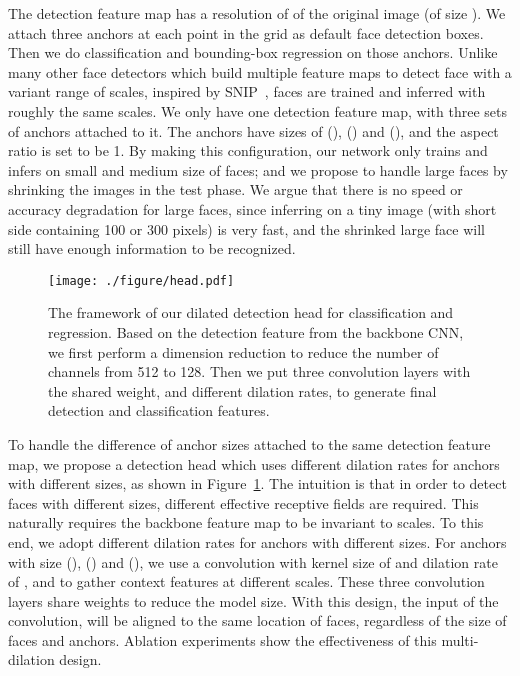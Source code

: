 \documentclass[10pt,twocolumn,letterpaper]{article}
\begin{document}
The detection feature map has a resolution of  of the original image (of size
).
We attach three anchors at each point in the grid as default face detection
boxes. Then we do classification and bounding-box regression on those  anchors.
Unlike many other face detectors which build multiple feature maps
to detect face with a variant range of scales, inspired by
SNIP~\cite{Singh2017AnAO}, faces are trained and inferred with roughly the same scales.
We only have one detection feature map, with three sets of anchors attached to it.
The anchors have sizes of (), () and (), and the
aspect ratio is set to be 1. By making this configuration, our network only trains and infers on small and medium size of faces; and we propose to handle large
faces by shrinking the images in the test phase. We argue that there is no speed
or accuracy degradation for large faces, since inferring on a tiny image (with short
side containing 100 or 300 pixels) is very fast, and the shrinked large face will still
have enough information to be recognized.

\begin{figure}[!t]
\texttt{[image: ./figure/head.pdf]}
\caption{The framework of our dilated detection head for classification and regression.
Based on the detection feature from the backbone CNN, we first
perform a dimension reduction to reduce the number of channels from 512 to 128.
Then we put three convolution layers with the shared weight, and different dilation rates,
to generate final detection and classification features.}
\label{fig:head}
\end{figure}
To handle the difference of anchor sizes attached to the same detection feature map, we propose a detection head which uses different dilation rates for anchors with
different sizes, as shown in Figure~\ref{fig:head}.
The intuition is that in order to detect faces with different sizes,
different effective receptive fields are required. This naturally
requires the backbone feature map to be invariant to scales. To this end,
we adopt different dilation rates for anchors with different sizes.
For anchors with size (),
() and (), we use a convolution with kernel size of
 and dilation rate of ,  and  to gather context features at
different scales. These three convolution layers share weights to
reduce the model size. With this design, the input of the  convolution,
will be aligned to the same location of faces, regardless of the size of faces
and anchors. Ablation experiments show the effectiveness of this multi-dilation design.
\end{document}
